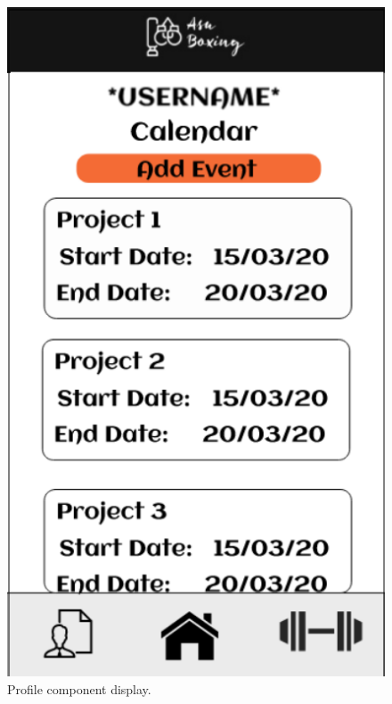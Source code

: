 \documentclass[a4paper,12pt]{report}
\begin{document}
\begin{figure}[h]
    \begin{center}
    \includegraphics[scale=.5]{images/profilePageBorder.png}
    \caption{Profile component display.}
    \label{fig:pComponent}
    \end{center}
\end{figure}
\end{document}
